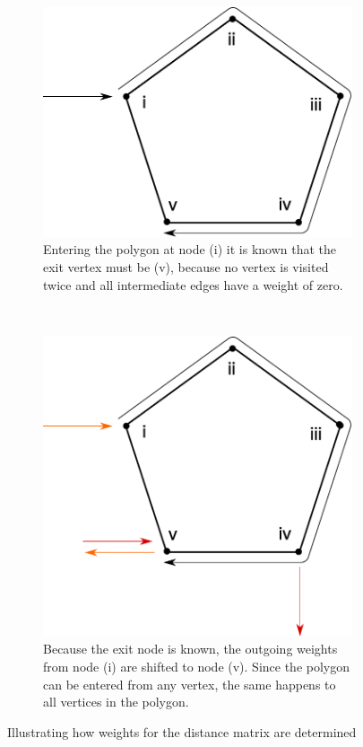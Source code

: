 \begin{figure}
\begin{subfigure}[t]{0.45\textwidth}
\includegraphics[width=1\textwidth]{images/path_planning/tsp_polygon_2.pdf}
\caption{Entering the polygon at node (i) it is known that the exit vertex must be (v), because no vertex is visited twice and all intermediate edges have a weight of zero.}
\end{subfigure}
~
\begin{subfigure}[t]{0.45\textwidth}
\includegraphics[width=1\textwidth]{images/path_planning/tsp_polygon_3.pdf}
\caption{Because the exit node is known, the outgoing weights from node (i) are shifted to node (v). Since the polygon can be entered from any vertex, the same happens to all vertices in the polygon.}
\end{subfigure}
\caption{Illustrating how weights for the distance matrix are determined}\label{fig:illdistweights}
\end{figure}


